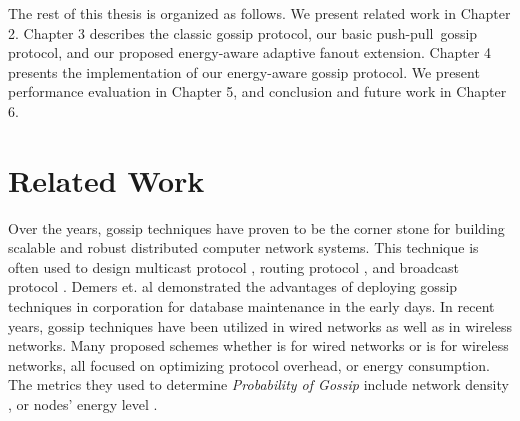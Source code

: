 \documentclass[onehalf,11pt]{beavtex}
\newcommand{\gp}{gossip protocol}
\newcommand{\pog}{Probability of Gossip}
\newcommand{\pp}{push-pull}
\begin{document}
The rest of this thesis is organized as follows. We present related work in Chapter 2. Chapter 3 describes the classic \gp, our basic \pp ~\gp, and our proposed energy-aware adaptive fanout extension. Chapter 4 presents the implementation of our energy-aware \gp. We present performance evaluation in Chapter 5, and conclusion and future work in Chapter 6.





\chapter{Related Work} \label{Chapter2}

Over the years, gossip techniques have proven to be the corner stone for building scalable and robust distributed computer network systems. This technique is often used to design multicast protocol \cite{gupta2002efficient}\cite{gossip} , routing protocol \cite{haas2006gossip}\cite{nitnaware2009performance}\cite{nitnaware2010energy}, and broadcast protocol \cite{smart}\cite{reina2012optimization}\cite{rodrigues2003adaptive}. Demers et. al \cite{demers1987epidemic} demonstrated the advantages of deploying gossip techniques in corporation for database maintenance in the early days. In recent years, gossip techniques have been utilized in wired networks \cite{birman1999bimodal} as well as in wireless networks. Many proposed schemes whether is for wired networks or is for wireless networks, all focused on optimizing protocol overhead, or energy consumption. The metrics they used to determine \emph{\pog} include network density \cite{cartigny2003border}\cite{wegener2007autocast}, or nodes' energy level \cite{nitnaware2009performance}\cite{nitnaware2010energy}.
\end{document}
